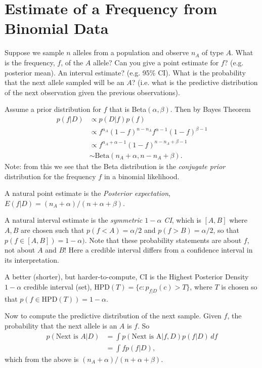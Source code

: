 \documentclass{article}[11pt]
\begin{document}
\section{Estimate of a Frequency from Binomial Data}

Suppose we sample $n$ alleles from a population
and observe $n_A$ of type $A$. What is the frequency, $f$,  of the $A$ allele? Can you give a point estimate for $f$? (e.g. posterior mean). An interval estimate? (e.g. 95\% CI). What is the probability that the next allele sampled will be an $A$? (i.e. what is the predictive distribution of the next observation given the previous observations).

Assume a prior distribution for $f$ that is
Beta$(\alpha,\beta)$. Then by Bayes Theorem
\begin{align}
p(f | D) & \propto p(D|f) p(f) \\
& \propto f^{n_A} (1-f)^{n-n_A} f^{\alpha-1} (1-f)^{\beta-1} \\
& \propto f^{n_A+\alpha-1} (1-f)^{n-n_A+\beta-1} \\
& \sim \text{Beta}(n_A+\alpha, n-n_A+\beta). 
\end{align}
Note: from this we see that the Beta distribution is the {\it conjugate prior} distribution for the frequency $f$ in a binomial likelihood.

A natural point estimate is the {\it Posterior expectation}, $E(f|D) = (n_A+\alpha)/(n+\alpha+\beta)$.  

A natural interval estimate is the {\it symmetric $1-\alpha$ CI}, which is $[A,B]$ where $A,B$ are chosen such that $p(f<A) = \alpha/2$ and $p(f>B)=\alpha/2$, so that $p(f \in [A,B]) = 1-\alpha)$. Note that these probability statements are about $f$, not about $A$ and $B$! Here a credible interval differs from a confidence interval in its interpretation.

A better (shorter), but harder-to-compute, CI is the Highest Posterior Density $1-\alpha$ credible interval (set), $\text{HPD}(T)=\{c : p_{f|D}(c)> T\}$, where $T$ is chosen so that $p(f \in \text{HPD}(T)) = 1-\alpha$.
  
Now to compute the predictive distribution of the next sample. Given $f$, the probability that the next allele is an $A$ is $f$.
So
\begin{align}
p(\text{Next is $A$} | D) & = \int p(\text{Next is A} | f,D ) p(f|D) \, df \\
& = \int f p(f|D), 
\end{align} 
which from the above is $(n_A+\alpha)/(n+\alpha+\beta)$.
\end{document}
